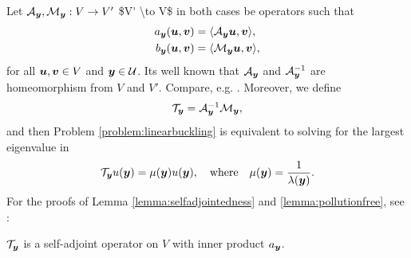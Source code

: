 Let $\mathcal{A}_{{\boldsymbol{y}}} ,\mathcal{M}_{{\boldsymbol{y}}} : V \to V'$ \ac{$V' \to V$ in both cases} be  operators such that 
\begin{align}
\label{eq:DefAy}
a_{{\boldsymbol{y}}}({\boldsymbol{u}}, {\boldsymbol{v}}) &= \langle \mathcal{A}_{{\boldsymbol{y}}} {\boldsymbol{u}} ,  {\boldsymbol{v}} \rangle, \\
\label{eq:DefMy}
b_{{\boldsymbol{y}}}({\boldsymbol{u}}, {\boldsymbol{v}}) &= \langle \mathcal{M}_{{\boldsymbol{y}}} {\boldsymbol{u}} ,  {\boldsymbol{v}} \rangle,
\end{align}
for all ${\boldsymbol{u}},{\boldsymbol{v}} \in V$ and ${\boldsymbol{y}} \in \mathcal{U}$. Its well known that $\mathcal{A}_{\boldsymbol{y}}$ and $\mathcal{A}_{\boldsymbol{y}}^{-1}$ are homeomorphism from $V$ and $V'$. Compare, e.g. \cite[(3.2)]{DaugeandSuriNumericalapproximation}. %
Moreover, we define 
\begin{align}\label{eq:definitionTy}
    \mathcal{T}_{{\boldsymbol{y}}} = \mathcal{A}_{{\boldsymbol{y}}}^{-1} \mathcal{M}_{{\boldsymbol{y}}},
\end{align}
and then Problem \ref{problem:linearbuckling} is equivalent to solving for the largest eigenvalue in
\begin{equation}\label{eq:eigenvalueproblemTy}
    \mathcal{T}_{{\boldsymbol{y}}} u({\boldsymbol{y}}) = \mu({\boldsymbol{y}}) u({\boldsymbol{y}}), \quad \text{where} \quad \mu({\boldsymbol{y}}) = \frac{1}{\lambda({\boldsymbol{y}})}.
\end{equation}
For the proofs of Lemma \ref{lemma:selfadjointedness} and \ref{lemma:pollutionfree}, see \cite[Section 3]{DaugeandSuriNumericalapproximation}: 
\begin{lemma}\label{lemma:selfadjointedness}
    $\mathcal{T}_{\boldsymbol{y}}$ is a self-adjoint operator on $V$ with inner product $a_{\boldsymbol{y}}$.
\end{lemma}

